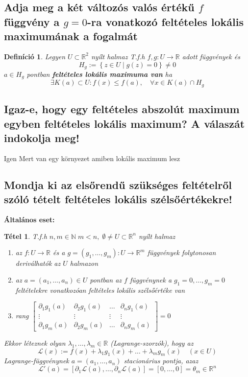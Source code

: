 \documentclass[12pt,a4paper]{article}
\newcommand{\R}{\mathbb{R}}
\newcommand{\N}{\mathbb{N}}
\newcommand{\CL}{\mathcal{L}}
\newcommand{\braces}[1]{\left\lbrace #1 \right\rbrace}
\newcommand{\boxes}[1]{\left[ #1 \right]}
\newtheorem{tet}{Tétel}[section]
\newtheorem{defi}{Definíció}[section]
\begin{document}
\subsection{Adja meg a két változós valós értékű $f$ függvény a $g = 0$-ra vonatkozó feltételes lokális maximumának a fogalmát}
\begin{defi}
Legyen $U \subset \R^2$ nyílt halmaz T.f.h $f,g: U \rightarrow \R $ adott függvények és
\[
H_g := \braces{z\in U \mid g(z) = 0} \neq 0
\]
$a \in H_g$ pontban \textbf{feltételes lokális maximuma van} ha
\[
\exists K(a) \subset U : f(x) \leq f(a), \quad \forall x \in K(a) \cap H_g 
\]
\end{defi}

\subsection{ Igaz-e, hogy egy feltételes abszolút maximum egyben feltételes lokális maximum? A válaszát indokolja meg!}
Igen
Mert van egy környezet amiben lokális maximum lesz

\subsection{Mondja ki az elsőrendű szükséges feltételről szóló tételt feltételes lokális szélsőértékekre!}
\textbf{Általános eset:}
\begin{tet}
T.f.h $n,m \in \N \; m < n, \; \emptyset \neq U \subset \R^n$ nyílt halmaz
\begin{enumerate}
\item[(a)] az $f : U \rightarrow \R $ és a $g = (g_1,\ldots , g_m) : U \rightarrow \R^m$ függvények folytonosan deriválhatók az $U$ halmazon
\item[(b)] az $a = (a_1, \ldots, a_n) \in U$ pontban az $f$ függvénynek a $g_1 = 0,\ldots ,g_m = 0$ feltételekre vonatkozóan feltételes lokális szélsőértéke van
\item[(c)] rang $\begin{bmatrix}
\partial_1 g_1(a) & \partial_2 g_1(a) & \ldots & \partial_n g_1(a) \\
\vdots & \vdots & \vdots & \vdots \\
\partial_1 g_m(a) & \partial_2 g_m(a) & \ldots & \partial_n g_m(a) 
\end{bmatrix} = 0 $
\end{enumerate}
Ekkor léteznek olyan $\lambda_1 , \ldots , \lambda_m \in \R$ (Lagrange-szorzók), hogy az
\[
\CL(x) := f(x) + \lambda_1 g_1 (x) + \ldots + \lambda_m g_m(x) \quad (x\in U)
\]
Lagrange-függvénynek $a = (a_1, \ldots , a_n)$ stacionárius pontja, azaz
\[
\CL' (a) = \boxes{\partial_1\CL(a), \ldots, \partial_n\CL(a)} = \boxes{0, \ldots ,0} = \theta_m \in \R^n
\]
\end{tet}
\end{document}
